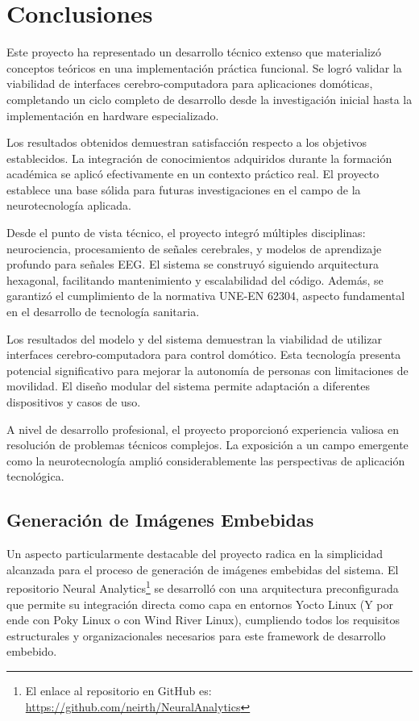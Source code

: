 \chapter{Conclusiones}

Este proyecto ha representado un desarrollo técnico extenso que materializó conceptos teóricos en una implementación práctica funcional. Se logró validar la viabilidad de interfaces cerebro-computadora para aplicaciones domóticas, completando un ciclo completo de desarrollo desde la investigación inicial hasta la implementación en hardware especializado.

Los resultados obtenidos demuestran satisfacción respecto a los objetivos establecidos. La integración de conocimientos adquiridos durante la formación académica se aplicó efectivamente en un contexto práctico real. El proyecto establece una base sólida para futuras investigaciones en el campo de la neurotecnología aplicada.

Desde el punto de vista técnico, el proyecto integró múltiples disciplinas: neurociencia, procesamiento de señales cerebrales, y modelos de aprendizaje profundo para señales EEG. El sistema se construyó siguiendo arquitectura hexagonal, facilitando mantenimiento y escalabilidad del código. Además, se garantizó el cumplimiento de la normativa UNE-EN 62304, aspecto fundamental en el desarrollo de tecnología sanitaria.

Los resultados del modelo y del sistema demuestran la viabilidad de utilizar interfaces cerebro-computadora para control domótico. Esta tecnología presenta potencial significativo para mejorar la autonomía de personas con limitaciones de movilidad. El diseño modular del sistema permite adaptación a diferentes dispositivos y casos de uso.

A nivel de desarrollo profesional, el proyecto proporcionó experiencia valiosa en resolución de problemas técnicos complejos. La exposición a un campo emergente como la neurotecnología amplió considerablemente las perspectivas de aplicación tecnológica.

\newpage
\section{Generación de Imágenes Embebidas}

Un aspecto particularmente destacable del proyecto radica en la simplicidad alcanzada para el proceso de generación de imágenes embebidas del sistema. El repositorio Neural Analytics\footnote{El enlace al repositorio en GitHub es: \url{https://github.com/neirth/NeuralAnalytics}} se desarrolló con una arquitectura preconfigurada que permite su integración directa como capa en entornos Yocto Linux (Y por ende con Poky Linux o con Wind River Linux), cumpliendo todos los requisitos estructurales y organizacionales necesarios para este framework de desarrollo embebido.

